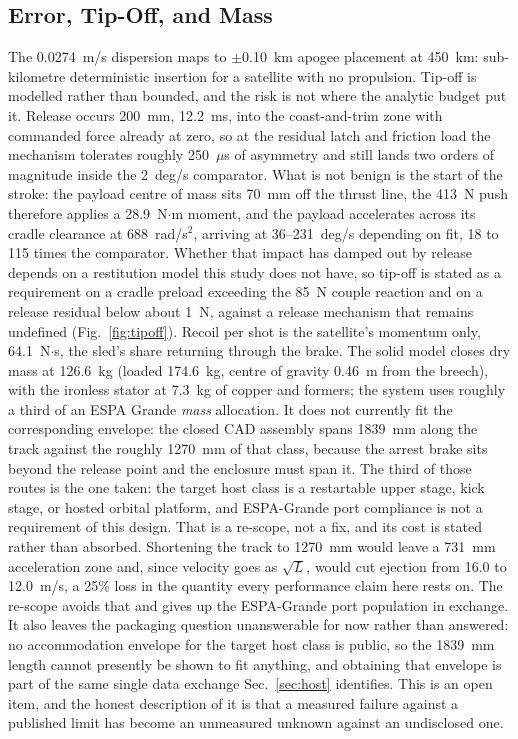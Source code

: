 \documentclass[conference]{IEEEtran}
\begin{document}
\subsection{Error, Tip-Off, and Mass}
The 0.0274~m/s dispersion maps to $\pm$0.10~km apogee placement at 450~km: sub-kilometre deterministic insertion for a satellite with no propulsion. Tip-off is modelled rather than bounded, and the risk is not where the analytic budget put it. Release occurs 200~mm, 12.2~ms, into the coast-and-trim zone with commanded force already at zero, so at the residual latch and friction load the mechanism tolerates roughly 250~$\mu$s of asymmetry and still lands two orders of magnitude inside the 2~deg/s comparator. What is not benign is the start of the stroke: the payload centre of mass sits 70~mm off the thrust line, the 413~N push therefore applies a 28.9~N$\cdot$m moment, and the payload accelerates across its cradle clearance at 688~rad/s$^2$, arriving at 36--231~deg/s depending on fit, 18 to 115 times the comparator. Whether that impact has damped out by release depends on a restitution model this study does not have, so tip-off is stated as a requirement on a cradle preload exceeding the 85~N couple reaction and on a release residual below about 1~N, against a release mechanism that remains undefined (Fig.~\ref{fig:tipoff}). Recoil per shot is the satellite's momentum only, 64.1~N$\cdot$s, the sled's share returning through the brake. The solid model closes dry mass at 126.6~kg (loaded 174.6~kg, centre of gravity 0.46~m from the breech), with the ironless stator at 7.3~kg of copper and formers; the system uses roughly a third of an ESPA Grande \emph{mass} allocation. It does not currently fit the corresponding envelope: the closed CAD assembly spans 1839~mm along the track against the roughly 1270~mm of that class, because the arrest brake sits beyond the release point and the enclosure must span it. The third of those routes is the one taken: the target host class is a restartable upper stage, kick stage, or hosted orbital platform, and ESPA-Grande port compliance is not a requirement of this design. That is a re-scope, not a fix, and its cost is stated rather than absorbed. Shortening the track to 1270~mm would leave a 731~mm acceleration zone and, since velocity goes as $\sqrt{L}$, would cut ejection from 16.0 to 12.0~m/s, a 25\% loss in the quantity every performance claim here rests on. The re-scope avoids that and gives up the ESPA-Grande port population in exchange. It also leaves the packaging question unanswerable for now rather than answered: no accommodation envelope for the target host class is public, so the 1839~mm length cannot presently be shown to fit anything, and obtaining that envelope is part of the same single data exchange Sec.~\ref{sec:host} identifies. This is an open item, and the honest description of it is that a measured failure against a published limit has become an unmeasured unknown against an undisclosed one.
\end{document}
